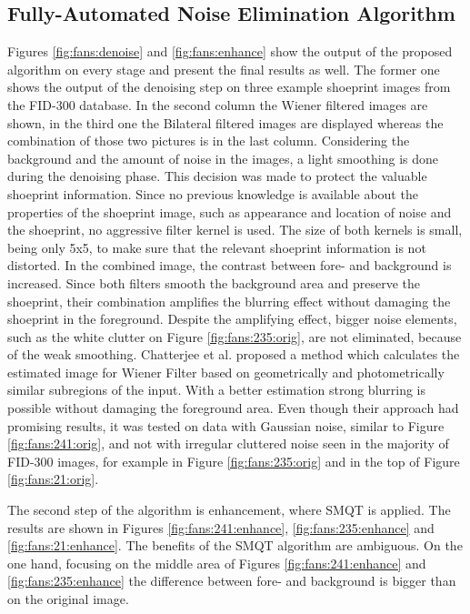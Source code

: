 \documentclass[draft,final]{vutinfth} %
\begin{document}
\subsection{Fully-Automated Noise Elimination Algorithm}
\par
Figures \ref{fig:fans:denoise} and \ref{fig:fans:enhance} show the output of the proposed algorithm on every stage and present the final results as well.
The former one shows the output of the denoising step on three example shoeprint images from the FID-300 database.
In the second column the Wiener filtered images are shown, in the third one the Bilateral filtered images are displayed whereas the combination of those two pictures is in the last column.
Considering the background and the amount of noise in the images, a light smoothing is done during the denoising phase.
This decision was made to protect the valuable shoeprint information.
Since no previous knowledge is available about the properties of the shoeprint image, such as appearance and location of noise and the shoeprint, no aggressive filter kernel is used.
The  size of both kernels is small, being only 5x5, to make sure that the relevant shoeprint information is not distorted.
In the combined image, the contrast between fore- and background is increased.
Since both filters smooth the background area and preserve the shoeprint, their combination amplifies the blurring effect without damaging the shoeprint in the foreground. 
Despite the amplifying effect, bigger noise elements, such as the white clutter on Figure \ref{fig:fans:235:orig}, are not eliminated, because of the weak smoothing.  
Chatterjee et al. \cite{chatterjee2011patch} proposed a method which calculates the estimated image for Wiener Filter based on geometrically and photometrically similar subregions of the input.
With a better estimation strong blurring is possible without damaging the foreground area.
Even though their approach had promising results, it was tested on data with Gaussian noise, similar to Figure \ref{fig:fans:241:orig}, and not with irregular cluttered noise seen in the majority of FID-300 images, for example in Figure \ref{fig:fans:235:orig} and in the top of Figure \ref{fig:fans:21:orig}.
\par
The second step of the algorithm is enhancement, where SMQT is applied.
The results are shown in Figures \ref{fig:fans:241:enhance}, \ref{fig:fans:235:enhance} and \ref{fig:fans:21:enhance}.
The benefits of the SMQT algorithm are ambiguous.
On the one hand, focusing on the middle area of Figures  \ref{fig:fans:241:enhance} and \ref{fig:fans:235:enhance} the difference between fore- and background is bigger than on the original image.
\end{document}
